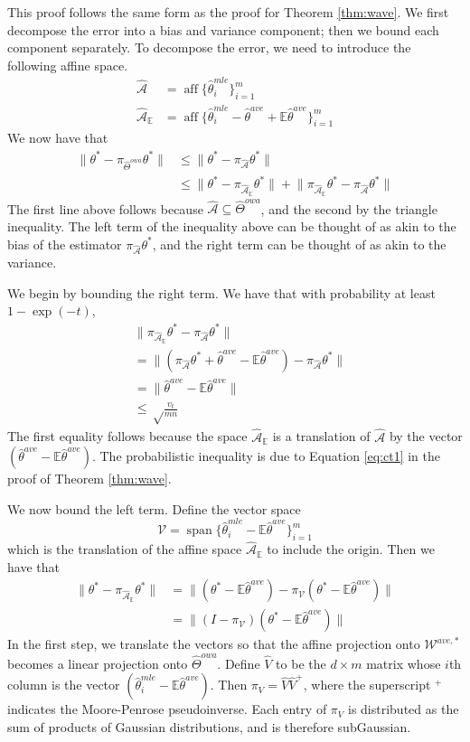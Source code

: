 \documentclass[twoside]{article}
\DeclareMathOperator*{\vecspan}{span}
\DeclareMathOperator*{\affspan}{aff}
\newcommand{\matV}{\hat V}
\newcommand{\W}{{\hat \Theta^{\textit{owa}}}}
\newcommand{\Waff}{\mathcal{\hat A}}
\newcommand{\WaffE}{{\mathcal{\hat A}_\E}}
\newcommand{\Wave}{{\mathcal{\hat W}^{ave}}}
\newcommand{\Wtave}{{\mathcal{W}^{ave,*}}}
\newcommand{\V}{\mathcal{V}}
\newcommand{\E}{\mathbb{E}}
\newcommand{\w}{\theta}
\newcommand{\wave}{\hat\w^{ave}}
\newcommand{\wtave}{\E\hat\w^{ave}}
\newcommand{\wmle}{\hat\w^{mle}}
\newcommand{\wstar}{{\w^{*}}}
\newcommand{\ltwo}[1]{{\lVert {#1} \rVert}}
\newcommand{\proj}[1]{\pi_{{#1}}}
\begin{document}
This proof follows the same form as the proof for Theorem \ref{thm:wave}.
We first decompose the error into a bias and variance component;
then we bound each component separately.
To decompose the error, we need to introduce the following affine space.
\begin{align}
\Waff&=\affspan \{\wmle_i\}_{i=1}^m
\\
\WaffE&=\affspan \{\wmle_i - \wave + \E\wave\}_{i=1}^m
\end{align}
We now have that
\begin{align}
\ltwo{\wstar-\proj\W\wstar}
&\le
\ltwo{\wstar-\proj\Waff\wstar}
\\
&\le
\ltwo{\wstar-\proj\WaffE\wstar}
+
\ltwo{\proj\WaffE\wstar-\proj\Waff\wstar}
\end{align}
The first line above follows because $\Waff\subseteq\W$,
and the second by the triangle inequality.
The left term of the inequality above can be thought of as akin to the bias of the estimator $\proj\Waff\wstar$,
and the right term can be thought of as akin to the variance.

We begin by bounding the right term.
We have that with probability at least $1-\exp(-t)$,
\begin{align}
&\ltwo{\proj\WaffE\wstar-\proj\Waff\wstar}
\\
&=
\ltwo{(\proj\Waff\wstar+\wave-\wtave)-\proj\Waff\wstar}
\\&=
\ltwo{\wave-\wtave}
\\&\le
\sqrt\frac{v_t}{mn}
\end{align}
The first equality follows because the space $\WaffE$ is a translation of $\Waff$ by the vector $(\wave-\wtave)$.
The probabilistic inequality is due to Equation \ref{eq:ct1} in the proof of Theorem \ref{thm:wave}.

We now bound the left term.
Define the vector space
\begin{equation}
\V=\vecspan \{\wmle_i - \wtave\}_{i=1}^m
\end{equation}
which is the translation of the affine space $\WaffE$ to include the origin.
Then we have that
\begin{align}
\ltwo{\wstar-\proj\WaffE\wstar}
&=
\ltwo{(\wstar-\wtave)-\proj\V(\wstar-\wtave)}
\\&=
\ltwo{(I-\proj\V)(\wstar-\wtave)}
\end{align}
In the first step, we translate the vectors so that the affine projection onto $\Wtave$ becomes a linear projection onto $\W$.
Define $\matV$ to be the $d \times m$ matrix whose $i$th column is the vector $(\wmle_i - \E\wave)$.
Then $\proj{V} = \matV\matV^+$, where the superscript $^+$ indicates the Moore-Penrose pseudoinverse.
Each entry of $\proj{V}$ is distributed as the sum of products of Gaussian distributions,
and is therefore subGaussian.
\end{document}
